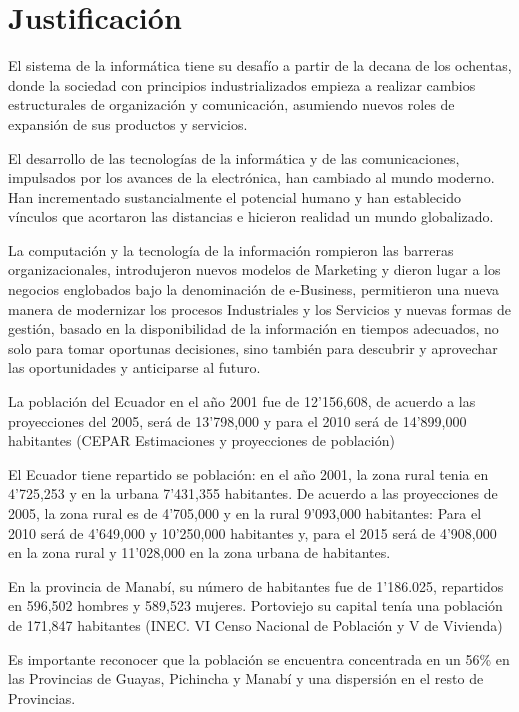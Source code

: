 \section{Justificación}

El sistema de la informática  tiene su desafío  a partir de la decana de los ochentas, donde la sociedad con principios industrializados empieza a realizar cambios estructurales de organización y  comunicación, asumiendo nuevos roles de expansión de  sus productos y servicios.

El desarrollo de las tecnologías  de la informática y de las comunicaciones, impulsados por los avances de la electrónica, han cambiado al mundo moderno. Han incrementado sustancialmente el potencial humano y han establecido vínculos que acortaron las distancias e hicieron realidad un mundo globalizado.

La computación y la tecnología de la información rompieron las barreras organizacionales, introdujeron nuevos modelos de Marketing y dieron lugar a los negocios englobados bajo la denominación de e-Business, permitieron una nueva manera de modernizar los procesos Industriales y los Servicios y nuevas formas de gestión, basado en la disponibilidad de la información en tiempos adecuados, no solo para tomar oportunas decisiones, sino también para descubrir y aprovechar las oportunidades y anticiparse al futuro.

La población del Ecuador en el año 2001 fue de 12'156,608, de acuerdo a las proyecciones del 2005, será de 13'798,000 y para el 2010 será de 14'899,000 habitantes (CEPAR Estimaciones y proyecciones de población)

El Ecuador tiene repartido se población: en el año 2001, la zona rural tenia en 4'725,253 y en la urbana 7'431,355 habitantes. De acuerdo a las proyecciones de 2005, la zona rural es de 4'705,000 y en la rural 9'093,000 habitantes: Para el 2010 será de 4'649,000 y 10'250,000 habitantes y, para el 2015 será de 4'908,000 en la zona rural y 11'028,000 en la zona urbana de habitantes.

En la provincia de Manabí, su número de habitantes fue de  1'186.025, repartidos en 596,502 hombres y 589,523 mujeres. Portoviejo su capital  tenía una población de 171,847 habitantes (INEC. VI Censo Nacional  de Población y V de Vivienda)

Es importante reconocer que la población se encuentra concentrada en un 56\% en las Provincias de Guayas, Pichincha y Manabí y una dispersión en el resto de Provincias.

